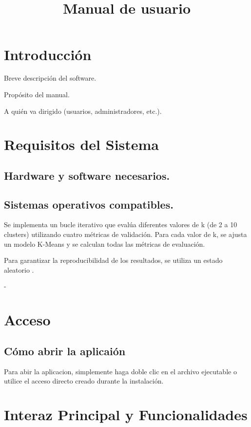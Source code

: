 \documentclass{Pretexto/bluereport}
\title{Manual de usuario}
\author{}
\date{}
\begin{document}

\tableofcontents
\pagebreak

\section{Introducción}

Breve descripción del software.

Propósito del manual.

A quién va dirigido (usuarios, administradores, etc.).

\section{Requisitos del Sistema}

\subsection{Hardware y software necesarios.}


\subsection{Sistemas operativos compatibles.}

Se implementa un bucle iterativo que evalúa diferentes valores de k (de 2 a 10 clusters) utilizando cuatro métricas de validación. Para cada valor de k, se ajusta un modelo K-Means y se calculan todas las métricas de evaluación.

\begin{importante}
Para garantizar la reproducibilidad de los resultados, se utiliza un estado aleatorio .
\end{importante}
-


\section{Acceso}
\subsection{Cómo abrir la aplicaión}

Para abir la aplicacion, simplemente haga doble clic en el archivo ejecutable o utilice el acceso directo creado durante la instalación.
\section{Interaz Principal y Funcionalidades}
\end{document}
